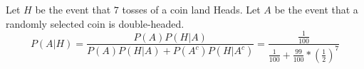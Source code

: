 Let $H$ be the event that $7$ tosses of a coin land Heads. 
Let $A$ be the event that a randomly selected coin is double-headed. 
$$P(A|H) = \frac{P(A)P(H|A)}{P(A)P(H|A) + P(A^{c})P(H|A^{c})} = 
\frac{\frac{1}{100}}{\frac{1}{100} + \frac{99}{100}*\left(\frac{1}{2}\right)^{7}}$$